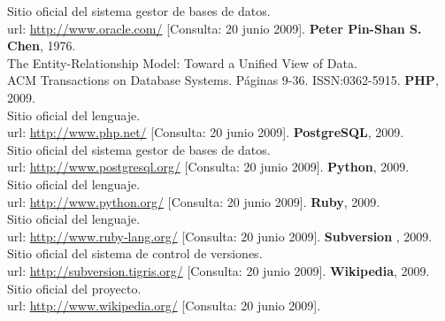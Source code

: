 \begin{thebibliography}{xx}
         Sitio oficial del sistema gestor de bases de datos.\\
         url: \url{http://www.oracle.com/}
         [Consulta: 20 junio 2009].
 \textbf{Peter Pin-Shan S. Chen}, 1976.\\
         The Entity-Relationship Model: Toward a Unified View of Data. \\
         ACM Transactions on Database Systems. Páginas 9-36.
         ISSN:0362-5915.
 \textbf{PHP}, 2009.\\
         Sitio oficial del lenguaje.\\
         url: \url{http://www.php.net/}
         [Consulta: 20 junio 2009].
 \textbf{PostgreSQL}, 2009.\\
         Sitio oficial del sistema gestor de bases de datos.\\
         url: \url{http://www.postgresql.org/}
         [Consulta: 20 junio 2009].
 \textbf{Python}, 2009.\\
         Sitio oficial del lenguaje.\\
         url: \url{http://www.python.org/}
         [Consulta: 20 junio 2009].
 \textbf{Ruby}, 2009.\\
         Sitio oficial del lenguaje.\\
         url: \url{http://www.ruby-lang.org/}
         [Consulta: 20 junio 2009].
 \textbf{Subversion} , 2009.\\
         Sitio oficial del sistema de control de versiones.\\
         url: \url{http://subversion.tigris.org/}
         [Consulta: 20 junio 2009].
 \textbf{Wikipedia}, 2009.\\
         Sitio oficial del proyecto.\\
         url: \url{http://www.wikipedia.org/}
         [Consulta: 20 junio 2009].
 \end{thebibliography}